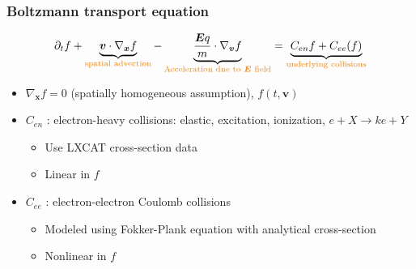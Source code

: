 \documentclass[mathserif, aspectratio=169]{beamer}
\newcommand{\vect}[1]{\boldsymbol{#1}}
\newcommand{\myint}{\int\limits}
\newcommand{\diff}[1]{\, d#1}
\begin{document}
\begin{frame}
	\frametitle{Boltzmann transport equation}
	\begin{align}
		\partial_t f  + \underbrace{\vect{v} \cdot \nabla_{\vect{x}} f}_{\textcolor{orange}{\text{spatial advection}}} -\underbrace{\frac{\vect{E} q}{m} \cdot \nabla_{\vect{v }}f}_{\textcolor{orange}{\text{Acceleration due to $\vect{E}$ field}}} = \underbrace{C_{en}f + C_{ee}(f)}_{\textcolor{orange}{\text{underlying collisions}}}
	\end{align}
	\begin{itemize}
		\item $\nabla_{\vect{x}} f =0$ (spatially homogeneous assumption), $f(t, \vect{v})$
		\item $C_{en}$ : electron-heavy collisions: elastic, excitation, ionization, $e + X \rightarrow k e + Y$
		\begin{itemize}
			\item Use LXCAT cross-section data 
			\item Linear in $f$
		\end{itemize} 
		\item $C_{ee}$ : electron-electron Coulomb collisions 
		\begin{itemize}
			\item Modeled using Fokker-Plank equation with analytical cross-section
			\item Nonlinear in $f$
		\end{itemize}
	\end{itemize}
\end{frame}
\end{document}

